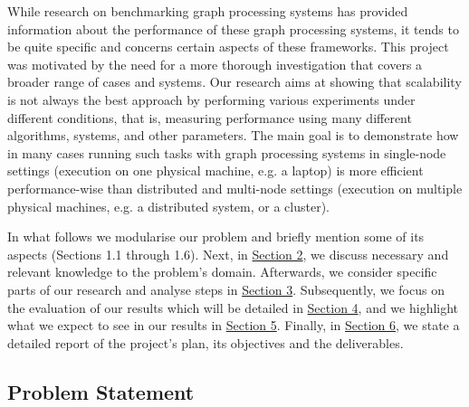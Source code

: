 \documentclass[a4paper,11pt]{article}
\begin{document}
\par While research on benchmarking graph processing systems has provided information about the performance of these graph processing systems, it tends to be quite specific and concerns certain aspects of these frameworks. This project was motivated by the need for a more thorough investigation that covers a broader range of cases and systems. Our research aims at showing that scalability is not always the best approach by performing various experiments under different conditions, that is, measuring performance using many different algorithms, systems, and other parameters. The main goal is to demonstrate how in many cases running such tasks with graph processing systems in single-node settings (execution on one physical machine, e.g. a laptop) is more efficient performance-wise than distributed and multi-node settings (execution on multiple physical machines, e.g. a distributed system, or a cluster).

\par In what follows we modularise our problem and briefly mention some of its aspects (Sections 1.1 through 1.6). Next, in \hyperref[background]{Section 2}, we discuss necessary and relevant knowledge to the problem's domain. Afterwards, we consider specific parts of our research and analyse steps in \hyperref[methodology]{Section 3}. Subsequently, we focus on the evaluation of our results which will be detailed in \hyperref[evaluation]{Section 4}, and we highlight what we expect to see in our results in \hyperref[outcomes]{Section 5}. Finally, in \hyperref[milestones]{Section 6}, we state a detailed report of the project's plan, its objectives and the deliverables.


\subsection{Problem Statement} \label{problem-statement}
\end{document}

